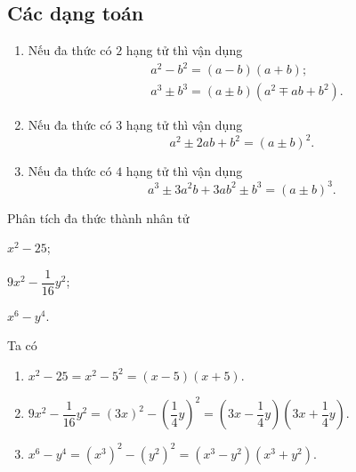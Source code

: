 \subsection{Các dạng toán}
\begin{dang}
\begin{enumerate}[\tickEX]
	\item Nếu đa thức có $2$ hạng tử thì vận dụng
		\begin{align*}
			&a^2 - b^2 = (a-b)(a+b); \\
			&a^3 \pm b^3 = (a\pm b)\left(a^2 \mp ab + b^2\right).
		\end{align*}
	\item Nếu đa thức có $3$ hạng tử thì vận dụng
		\[a^2 \pm 2ab + b^2 = (a \pm b)^2.\]
	\item Nếu đa thức có $4$ hạng tử thì vận dụng
		\[a^3 \pm 3a^2b + 3ab^2 \pm b^3 = (a \pm b)^3.\]
\end{enumerate}
\end{dang}

\begin{vd}
	Phân tích đa thức thành nhân tử
	\begin{listEX}[3]
		\item $x^2 - 25$;
		\item $9x^2 - \dfrac{1}{16}y^2$;
		\item $x^6 - y^4$.
	\end{listEX}
	\loigiai 
	{
		Ta có
		\begin{enumerate}
			\item $x^2 - 25 = x^2 - 5^2 = (x-5)(x+5).$
			\item $9x^2 - \dfrac{1}{16}y^2 = (3x)^2 - \left(\dfrac{1}{4}y\right)^2 = \left(3x - \dfrac{1}{4}y\right)\left(3x + \dfrac{1}{4}y\right).$
			\item $x^6 - y^4 = \left(x^3\right)^2 - \left(y^2\right)^2 = \left(x^3 - y^2\right)\left(x^3 + y^2\right).$
		\end{enumerate}
	}
\end{vd}

